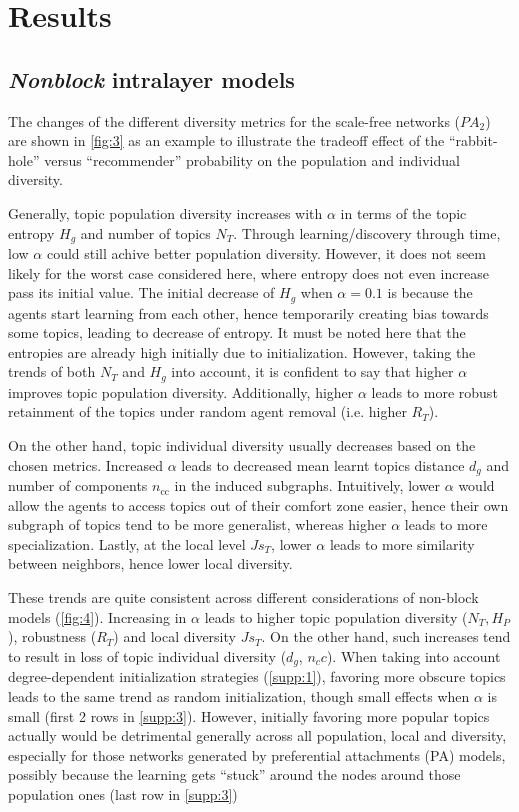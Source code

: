 \section{Results}

\subsection{\textit{Nonblock} intralayer models}




The changes of the different diversity metrics for the scale-free networks ($PA_2$) are shown in \ref{fig:3} as an example to illustrate the tradeoff effect of the ``rabbit-hole'' versus ``recommender'' probability on the population and individual diversity.

Generally, topic population diversity increases with $\alpha$ in terms of the topic entropy $H_g$ and number of topics $N_T$. Through learning/discovery through time, low $\alpha$ could still achive better population diversity. However, it does not seem likely for the worst case considered here, where entropy does not even increase pass its initial value. The initial decrease of $H_g$ when $\alpha = 0.1$ is because the agents start learning from each other, hence temporarily creating bias towards some topics, leading to decrease of entropy. It must be noted here that the entropies are already high initially due to initialization. However, taking the trends of both $N_T$ and $H_g$ into account, it is confident to say that higher $\alpha$ improves topic population diversity. Additionally, higher $\alpha$ leads to more robust retainment of the topics under random agent removal (i.e. higher $R_T$).

On the other hand, topic individual diversity usually decreases based on the chosen metrics. Increased $\alpha$ leads to decreased mean learnt topics distance $d_g$ and number of components $n_{\mathrm{cc}}$ in the induced subgraphs. Intuitively, lower $\alpha$ would allow the agents to access topics out of their comfort zone easier, hence their own subgraph of topics tend to be more generalist, whereas higher $\alpha$ leads to more specialization. Lastly, at the local level $Js_T$, lower $\alpha$ leads to more similarity between neighbors, hence lower local diversity.

These trends are quite consistent across different considerations of non-block models (\ref{fig:4}). Increasing in $\alpha$ leads to higher topic population diversity ($N_T, H_P$), robustness ($R_T$) and local diversity $Js_T$. On the other hand, such increases tend to result in loss of topic individual diversity ($d_g$, $n_cc$). When taking into account degree-dependent initialization strategies (\ref{supp:1}), favoring more obscure topics leads to the same trend as random initialization, though small effects when $\alpha$ is small (first 2 rows in \ref{supp:3}). However, initially favoring more popular topics actually would be detrimental generally across all population, local and diversity, especially for those networks generated by preferential attachments (PA) models, possibly because the learning gets ``stuck'' around the nodes around those population ones (last row in \ref{supp:3})

